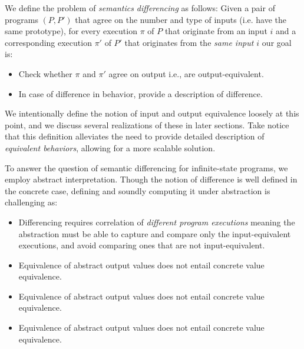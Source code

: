 We define the problem of \emph{semantics differencing} as follows: Given a pair of programs $(P,P')$ that agree on the number and type of inputs (i.e. have the same prototype), for every execution $\pi$ of $P$ that originate from an input $i$ and a corresponding execution $\pi'$ of $P'$ that originates from the \emph{same input $i$} our goal is:
\begin{itemize}
\item Check whether $\pi$ and $\pi'$ agree on output i.e., are output-equivalent.
\item In case of difference in behavior, provide a description of difference.
\end{itemize}
We intentionally define the notion of input and output equivalence loosely at this point, and we discuss several realizations of these in later sections. Take notice that this definition alleviates the need to provide detailed description of \emph{equivalent behaviors}, allowing for a more scalable solution.

To answer the question of semantic differencing for infinite-state programs, we employ abstract interpretation. Though the notion of difference is well defined in the concrete case, defining and soundly computing it under abstraction is challenging as:
\begin{itemize}
\item Differencing requires correlation of \emph{different program executions} meaning the abstraction must be able to capture and compare only the input-equivalent executions, and avoid comparing ones that are not input-equivalent.
\item Equivalence of abstract output values does not entail concrete value equivalence.
\end{itemize}

\begin{itemize}
\item Equivalence of abstract output values does not entail concrete value equivalence.
\item Equivalence of abstract output values does not entail concrete value equivalence.
\end{itemize}

